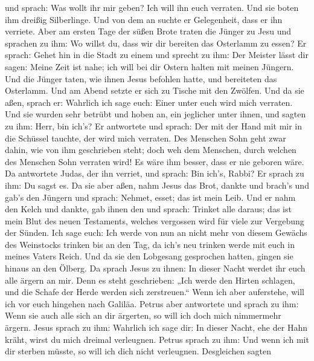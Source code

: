 und sprach: Was wollt ihr mir geben? Ich will ihn euch verraten. Und sie
boten ihm dreißig Silberlinge.  Und von dem an suchte er
Gelegenheit, dass er ihn verriete.  Aber am ersten Tage der
süßen Brote traten die Jünger zu Jesu und sprachen zu ihm: Wo willst du,
dass wir dir bereiten das Osterlamm zu essen?  Er sprach:
Gehet hin in die Stadt zu einem und sprecht zu ihm: Der Meister lässt
dir sagen: Meine Zeit ist nahe; ich will bei dir Ostern halten mit
meinen Jüngern.  Und die Jünger taten, wie ihnen Jesus
befohlen hatte, und bereiteten das Osterlamm.  Und am Abend
setzte er sich zu Tische mit den Zwölfen.  Und da sie aßen,
sprach er: Wahrlich ich sage euch: Einer unter euch wird mich verraten.
 Und sie wurden sehr betrübt und hoben an, ein jeglicher
unter ihnen, und sagten zu ihm: Herr, bin ich's?  Er
antwortete und sprach: Der mit der Hand mit mir in die Schüssel tauchte,
der wird mich verraten.  Des Menschen Sohn geht zwar dahin,
wie von ihm geschrieben steht; doch weh dem Menschen, durch welchen des
Menschen Sohn verraten wird! Es wäre ihm besser, dass er nie geboren
wäre.  Da antwortete Judas, der ihn verriet, und sprach:
Bin ich's, Rabbi? Er sprach zu ihm: Du sagst es.  Da sie
aber aßen, nahm Jesus das Brot, dankte und brach's und gab's den Jüngern
und sprach: Nehmet, esset; das ist mein Leib.  Und er nahm
den Kelch und dankte, gab ihnen den und sprach: Trinket alle daraus;
 das ist mein Blut des neuen Testaments, welches vergossen
wird für viele zur Vergebung der Sünden.  Ich sage euch:
Ich werde von nun an nicht mehr von diesem Gewächs des Weinstocks
trinken bis an den Tag, da ich's neu trinken werde mit euch in meines
Vaters Reich.  Und da sie den Lobgesang gesprochen hatten,
gingen sie hinaus an den Ölberg.  Da sprach Jesus zu ihnen:
In dieser Nacht werdet ihr euch alle ärgern an mir. Denn es steht
geschrieben: „Ich werde den Hirten schlagen, und die Schafe der Herde
werden sich zerstreuen.``  Wenn ich aber auferstehe, will
ich vor euch hingehen nach Galiläa.  Petrus aber antwortete
und sprach zu ihm: Wenn sie auch alle sich an dir ärgerten, so will ich
doch mich nimmermehr ärgern.  Jesus sprach zu ihm: Wahrlich
ich sage dir: In dieser Nacht, ehe der Hahn kräht, wirst du mich dreimal
verleugnen.  Petrus sprach zu ihm: Und wenn ich mit dir
sterben müsste, so will ich dich nicht verleugnen. Desgleichen sagten
